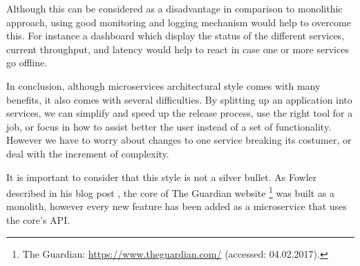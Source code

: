 \begin{description}[style=nextline]
Although this can be considered as a disadvantage in comparison to monolithic approach, using good monitoring and logging mechanism would help to overcome this. For instance a dashboard which display the status of the different services, current throughput, and latency would help to react in case one or more services go offline.
\end{description}

In conclusion, although microservices architectural style comes with many benefits, it also comes with several difficulties. By splitting up an application into services, we can simplify and speed up the release process, use the right tool for a job, or focus in how to assist better the user instead of a set of functionality. However we have to worry about changes to one service breaking its costumer, or deal with the increment of complexity.

It is important to consider that this style is not a silver bullet. As Fowler described in his blog post \cite{Fowler2014}, the core of The Guardian website \footnote{The Guardian: \url{https://www.theguardian.com/} (accessed: 04.02.2017).} was built as a monolith, however every new feature has been added as a microservice that uses the core's API.